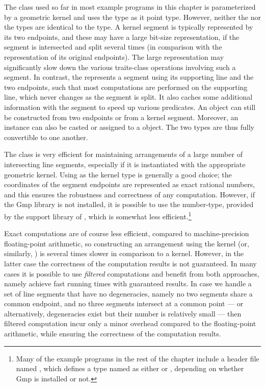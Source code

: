 The  class used so far
in most example programs in this chapter is parameterized by a
geometric kernel and uses the  type as it
point type. However, neither the  nor the
 types are identical to the
 type. A kernel segment is typically
represented by its two endpoints, and these may have a large bit-size
representation, if the segment is intersected and split several
times (in comparison with the representation of its original
endpoints). The large representation may significantly slow down the
various traits-class operations involving such a segment. In contrast,
the  represents a segment using
its supporting line and the two endpoints, such that most computations
are performed on the supporting line, which never changes as the
segment is split. It also caches some additional information with
the segment to speed up various predicates.
An  object can still be constructed from two
endpoints or from a kernel segment. Moreover, an
 instance can also be casted or assigned to a
 object. The two types are thus fully
convertible to one another.

The  class is very efficient for
maintaining arrangements of a large number of intersecting line
segments, especially if it is instantiated with the appropriate
geometric kernel. Using  as the kernel type is
generally a good choice; the coordinates of the segment endpoints are
represented as exact rational numbers, and this ensures the robustness
and correctness of any computation. However, if the {\sc Gmp}
library is not installed, it is possible to use the
 number-type, provided by the support library
of \cgal, which is somewhat less efficient.\footnote{Many of the
example programs in the rest of the chapter include a header file
named , which defines a type named
 as either  or ,
depending on whether {\sc Gmp} is installed or not.}

Exact computations are of course less efficient, compared to
machine-precision floating-point arithmetic, so constructing an
arrangement using the  kernel (or, similarly,
)  is several times slower in
comparison to a  kernel. However, in
the latter case the correctness of the computation results is not
guaranteed. In many cases it is possible to use \emph{filtered}
computations and benefit from both approaches, namely achieve fast
running times with guaranteed results. In case we handle a set of
line segments that have no degeneracies, namely no two segments
share a common endpoint, and no three segments intersect at a common
point --- or alternatively, degeneracies exist but their number is
relatively small --- then filtered computation incur only a minor
overhead compared to the floating-point arithmetic, while ensuring
the correctness of the computation results.

